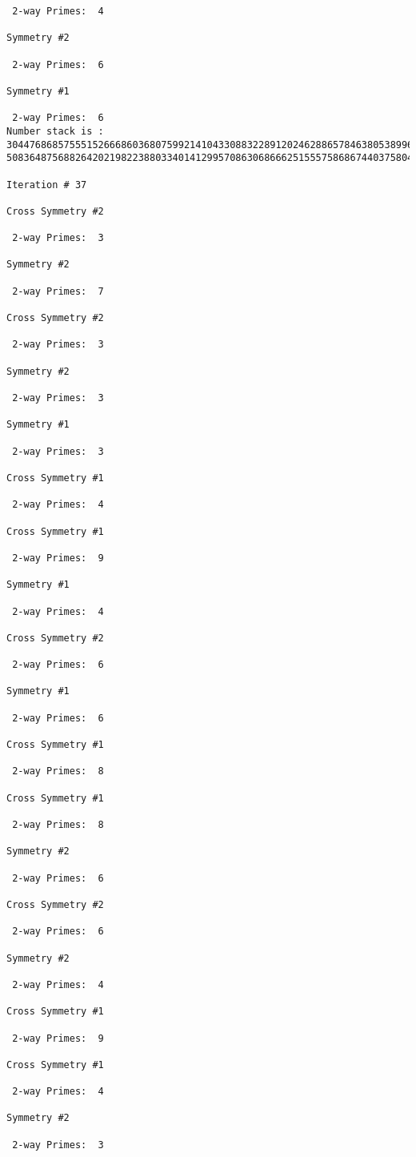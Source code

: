 {{{{\begin{verbatim}
 2-way Primes: 	4

Symmetry #2

 2-way Primes: 	6

Symmetry #1

 2-way Primes: 	6
Number stack is :
30447686857555152666860368075992141043308832289120246288657846380538996794608835958544046240163340857
50836487568826420219822388033401412995708630686662515557586867440375804336104264044585953880649769983

Iteration #	37

Cross Symmetry #2

 2-way Primes: 	3

Symmetry #2

 2-way Primes: 	7

Cross Symmetry #2

 2-way Primes: 	3

Symmetry #2

 2-way Primes: 	3

Symmetry #1

 2-way Primes: 	3

Cross Symmetry #1

 2-way Primes: 	4

Cross Symmetry #1

 2-way Primes: 	9

Symmetry #1

 2-way Primes: 	4

Cross Symmetry #2

 2-way Primes: 	6

Symmetry #1

 2-way Primes: 	6

Cross Symmetry #1

 2-way Primes: 	8

Cross Symmetry #1

 2-way Primes: 	8

Symmetry #2

 2-way Primes: 	6

Cross Symmetry #2

 2-way Primes: 	6

Symmetry #2

 2-way Primes: 	4

Cross Symmetry #1

 2-way Primes: 	9

Cross Symmetry #1

 2-way Primes: 	4

Symmetry #2

 2-way Primes: 	3


\end{verbatim}}}}}
